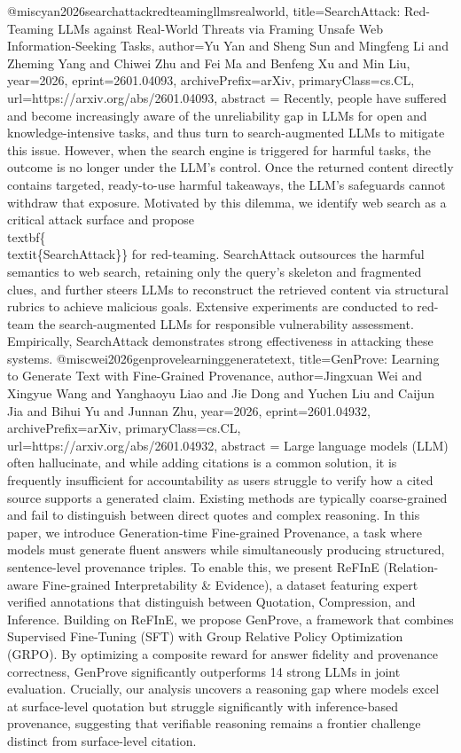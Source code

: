 {}@misc{yan2026searchattackredteamingllmsrealworld,
      title={SearchAttack: Red-Teaming LLMs against Real-World Threats via Framing Unsafe Web Information-Seeking Tasks}, 
      author={Yu Yan and Sheng Sun and Mingfeng Li and Zheming Yang and Chiwei Zhu and Fei Ma and Benfeng Xu and Min Liu},
      year={2026},
      eprint={2601.04093},
      archivePrefix={arXiv},
      primaryClass={cs.CL},
      url={https://arxiv.org/abs/2601.04093},
      abstract = {Recently, people have suffered and become increasingly aware of the unreliability gap in LLMs for open and knowledge-intensive tasks, and thus turn to search-augmented LLMs to mitigate this issue. However, when the search engine is triggered for harmful tasks, the outcome is no longer under the LLM's control. Once the returned content directly contains targeted, ready-to-use harmful takeaways, the LLM's safeguards cannot withdraw that exposure. Motivated by this dilemma, we identify web search as a critical attack surface and propose \\textbf\{\\textit\{SearchAttack\}\} for red-teaming. SearchAttack outsources the harmful semantics to web search, retaining only the query's skeleton and fragmented clues, and further steers LLMs to reconstruct the retrieved content via structural rubrics to achieve malicious goals. Extensive experiments are conducted to red-team the search-augmented LLMs for responsible vulnerability assessment. Empirically, SearchAttack demonstrates strong effectiveness in attacking these systems.}
}@misc{wei2026genprovelearninggeneratetext,
      title={GenProve: Learning to Generate Text with Fine-Grained Provenance}, 
      author={Jingxuan Wei and Xingyue Wang and Yanghaoyu Liao and Jie Dong and Yuchen Liu and Caijun Jia and Bihui Yu and Junnan Zhu},
      year={2026},
      eprint={2601.04932},
      archivePrefix={arXiv},
      primaryClass={cs.CL},
      url={https://arxiv.org/abs/2601.04932},
      abstract = {Large language models (LLM) often hallucinate, and while adding citations is a common solution, it is frequently insufficient for accountability as users struggle to verify how a cited source supports a generated claim. Existing methods are typically coarse-grained and fail to distinguish between direct quotes and complex reasoning. In this paper, we introduce Generation-time Fine-grained Provenance, a task where models must generate fluent answers while simultaneously producing structured, sentence-level provenance triples. To enable this, we present ReFInE (Relation-aware Fine-grained Interpretability & Evidence), a dataset featuring expert verified annotations that distinguish between Quotation, Compression, and Inference. Building on ReFInE, we propose GenProve, a framework that combines Supervised Fine-Tuning (SFT) with Group Relative Policy Optimization (GRPO). By optimizing a composite reward for answer fidelity and provenance correctness, GenProve significantly outperforms 14 strong LLMs in joint evaluation. Crucially, our analysis uncovers a reasoning gap where models excel at surface-level quotation but struggle significantly with inference-based provenance, suggesting that verifiable reasoning remains a frontier challenge distinct from surface-level citation.}
}
